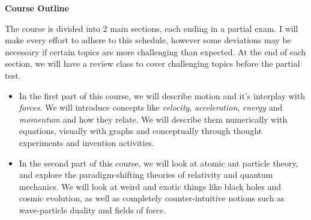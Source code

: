 \documentclass[12pt]{article}
\begin{document}
\noindent \textbf{Course Outline}

The course is divided into 2 main sections, each ending in a partial exam. I will make every effort to adhere to this schedule, however some deviations may be necessary if certain topics are more challenging than expected. At the end of each section, we will have a review class to cover challenging topics before the partial test.

\begin{itemize}

\item In the first part of this course, we will describe motion and it's interplay with \textit{forces}. We will introduce concepts like \textit{velocity}, \textit{acceleration}, \textit{energy} and \textit{momentum} and how they relate. We will describe them numerically with equations, visually with graphs and conceptually through thought experiments and invention activities.
\item In the second part of this course, we will look at atomic ant particle theory, and explore the paradigm-shifting theories of relativity and quantum mechanics. We will look at weird and exotic things like black holes and cosmic evolution, as well as completely counter-intuitive notions such as wave-particle duality and fields of force.


\end{itemize}
\end{document}
